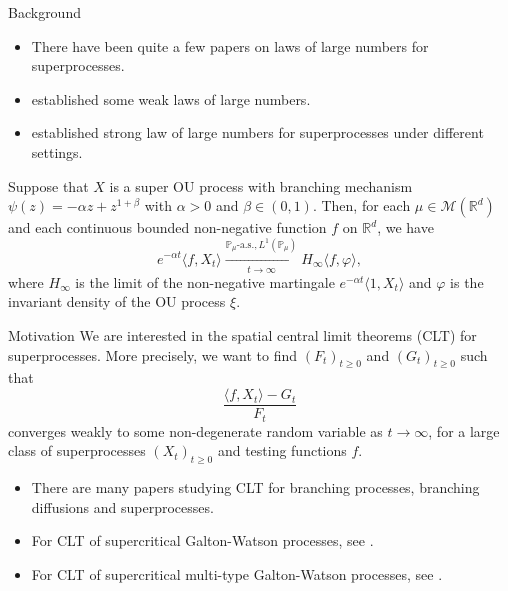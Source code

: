 \documentclass[9pt]{beamer}
\begin{document}
\begin{frame}[allowframebreaks]{Background}
\begin{itemize}
\item
	There have been quite a few papers on laws of large numbers for superprocesses. 
\item
	\cite{Englander2009Law,EnglanderWinter2006Law,EnglanderTuraev2002A-scaling} established some {\color{red}weak laws of large numbers}.
\item
	\cite{ChenRenWang2008An-almost,Wang2010An-almost,LiuRenSong2013Strong,KouritzinRen2014A-strong,ChenRenSongZhang2015Strong,EckhoffKyprianouWinkel2015Spines,ChenRenYang2019Skeleton} established {\color{red}strong law of large numbers} for superprocesses under different settings.
\end{itemize}
\begin{example}
	Suppose that $X$ is a super OU process with branching mechanism $\psi(z)=-\alpha z+ z^{1+\beta}$ with $\alpha>0$ and $\beta \in (0,1)$. Then, for each $\mu \in \mathcal M(\mathbb R^d)$ and each continuous bounded non-negative function $f$ on $\mathbb R^d$, we have
\[
	e^{-\alpha t} \langle f, X_t\rangle \xrightarrow[t\to \infty]{\mathbb P_\mu \text{-a.s.}, L^1(\mathbb P_\mu)} H_\infty \langle f, \varphi\rangle,
\]
	where $H_\infty$ is the limit of the non-negative martingale $e^{-\alpha t}\langle 1,X_t\rangle$ and $\varphi$ is the invariant density of the OU process $\xi$.
\end{example}
\begin{block}{Motivation}
	We are interested in the spatial central limit theorems (CLT) for superprocesses.
	More precisely, we want to find
    $(F_t)_{t\geq 0}$ and $(G_t)_{t\geq 0}$ such that
\[
    \frac{\langle f, X_t \rangle -G_t}{F_t}
\]
    converges weakly to some non-degenerate random variable as $t\rightarrow\infty$, for a large class of superprocesses $(X_t)_{t\geq 0}$ and testing functions $f$.
\end{block}
\begin{itemize}
\item
	There are many papers studying CLT for branching processes, branching diffusions and superprocesses.
\item
	For CLT of supercritical {\color{red} Galton-Watson processes}, see \cite{Heyde1970A-rate,HeydeBrown1871An-invariance,HeydeLeslie1971Improved}.
\item 
	For CLT of supercritical  {\color{red} multi-type Galton-Watson processes}, see \cite{Athreya1969Limit,Athreya1969LimitB,Athreya1971Some}.

\end{itemize}
\end{frame}
\end{document}
